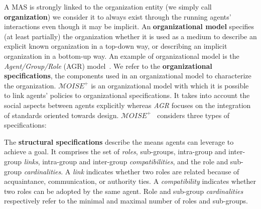 A MAS is strongly linked to the organization entity (we simply call \textbf{organization}) we consider it to always exist through the running agents' interactions even though it may be implicit.
%
%
An \textbf{organizational model} specifies (at least partially) the organization whether it is used as a medium to describe an explicit known organization in a top-down way, or describing an implicit organization in a bottom-up way. An example of organizational model is the \emph{Agent/Group/Role} (AGR) model~\cite{Ferber2004}. We refer to the \textbf{organizational specifications}, the components used in an organizational model to characterize the organization. $\mathcal{M}OISE^+$ is an organizational model with which it is possible to link agents' policies to organizational specifications. It takes into account the social aspects between agents explicitly whereas \emph{AGR} focuses on the integration of standards oriented towards design. $\mathcal{M}OISE^+$~\cite{Hubner2007} considers three types of specifications:

The \textbf{structural specifications} describe the means agents can leverage to achieve a goal. It comprises the set of \emph{roles}, sub-groups, intra-group and inter-group \emph{links}, intra-group and inter-group \emph{compatibilities}, and the role and sub-group \emph{cardinalities}.
A \emph{link} indicates whether two roles are related because of acquaintance, communication, or authority ties. A \emph{compatibility} indicates whether two roles can be adopted by the same agent. Role and sub-group \emph{cardinalities} respectively refer to the minimal and maximal number of roles and sub-groups.

